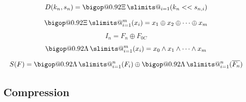 \documentclass[10pt]{article}
\makeatletter
\DeclareRobustCommand\bigop[2][1]{%
  \mathop{\vphantom{\sum}\mathpalette\bigop@{{#1}{#2}}}\slimits@
}
\newcommand{\bigop@}[2]{\bigop@@#1#2}
\newcommand{\bigop@@}[3]{%
  \vcenter{%
    \sbox\z@{$#1\sum$}%
    \hbox{\resizebox{\ifx#1\displaystyle#2\fi\dimexpr\ht\z@+\dp\z@}{!}{$\m@th#3$}}%
  }%
}
\newcommand{\XORsum}{\DOTSB\bigop[0.92]{\Xi}}
\newcommand{\ANDsum}{\DOTSB\bigop[0.92]{\Lambda}}
\makeatother
\begin{document}
\begin{equation}\label{eqn:decodeFunc}
    D(k_n,s_n)=\XORsum_{i=1}(k_n << s_{n,i})
\end{equation}
\begin{equation}\label{eqn:xorsum}
    \XORsum_{i=1}^m(x_i)=x_1\oplus x_2\oplus \dots \oplus x_m
\end{equation}
\begin{equation}\label{eqn:intermediate}
    I_n=F_n\oplus F_{0C}
\end{equation}
\begin{equation}
    \ANDsum_{i=1}^m(x_i)=x_0\wedge x_1\wedge \dots \wedge x_m
\end{equation}
\begin{equation}
    S(F)=\ANDsum_{i=1}^n(F_i) \oplus \ANDsum_{i=1}^n(\overline{F_n})
\end{equation}

\subsection{Compression}\label{subsec:compression}
\end{document}
